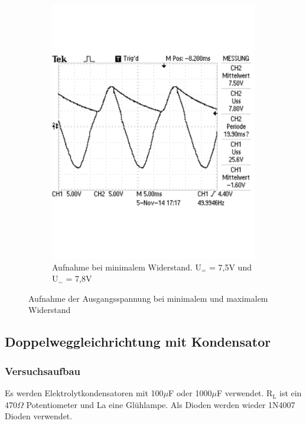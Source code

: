 \documentclass[12pt,a4paper]{article}
\begin{document}
\begin{figure}[H]
\begin{subfigure}[b]{0.48\textwidth}
                \includegraphics[width=\textwidth , scale = 0.4]{2_4_100F_2.pdf}
                \caption[Aufnahme bei minimalem Widerstand. U$_{=}$ = 7,5V und U$_\sim$ = 7,8V]{Aufnahme bei minimalem Widerstand. U$_{=}$ = 7,5V und U$_\sim$ = 7,8V}
  				\label{fig:2_4_1000F_2}
        \end{subfigure}
        \caption{Aufnahme der Ausgangsspannung bei minimalem und maximalem Widerstand}
        \label{fig:2_4_1000F}
\end{figure}

\subsection{Doppelweggleichrichtung mit Kondensator}
\subsubsection{Versuchsaufbau}
Es werden Elektrolytkondensatoren mit 100$\mu$F oder 1000$\mu$F verwendet. R$_\text{L}$ ist ein 470$\Omega$ Potentiometer und La eine Glühlampe. Als Dioden werden wieder 1N4007 Dioden verwendet.
\end{document}
